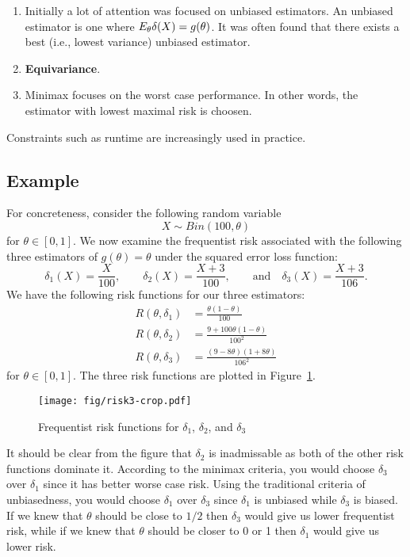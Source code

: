 \documentclass[twoside]{article}
\begin{document}
\begin{enumerate}
\item Initially a lot of attention was focused on unbiased estimators. An
  unbiased estimator is one where $E_{\theta}\delta(X) = g(\theta)$. It
  was often found that there exists a best (i.e., lowest variance) unbiased
  estimator.
\item \textbf{Equivariance}.
\item Minimax focuses on the worst case performance.  In other words, the estimator
   with lowest maximal risk is choosen.
\end{enumerate}

Constraints such as runtime are increasingly used in practice.

\subsection{Example}

For concreteness, consider \citep[Example 3.1, p.~40-41]{keener} the following
random variable
\begin{equation*}
X \sim Bin(100, \theta)
\end{equation*}
for $\theta \in [0,1]$.  We now examine the frequentist risk associated with
the following three estimators of $g(\theta) = \theta$ under the squared error
loss function:
\begin{equation*}
\delta_1(X) = \frac{X}{100}, \qquad \delta_2(X) = \frac{X+3}{100},
              \qquad \text{and} \quad \delta_3(X) = \frac{X+3}{106}.
\end{equation*}
We have the following risk functions for our three estimators:
\begin{align*}
R(\theta, \delta_1) &= \frac{\theta(1-\theta)}{100}\\
R(\theta, \delta_2) &= \frac{9+100 \theta(1-\theta)}{100^2}\\
R(\theta, \delta_3) &= \frac{(9-8\theta)(1+8\theta)}{106^2}
\end{align*}
for $\theta \in [0,1]$.  The three risk functions are plotted in
Figure~\ref{fig:figure3}. 

\begin{figure}[ht]
\centering
\texttt{[image: fig/risk3-crop.pdf]}
\caption{Frequentist risk functions for $\delta_1$, $\delta_2$, and $\delta_3$}
\label{fig:figure3}
\end{figure}

It should be clear from the figure that $\delta_2$ is inadmissable as both
of the other risk functions dominate it.  According to the minimax criteria,
you would choose $\delta_3$ over $\delta_1$ since it has better worse case
risk.  Using the traditional criteria of unbiasedness, you would choose
$\delta_1$ over $\delta_3$ since $\delta_1$ is unbiased while $\delta_3$ is
biased.  If we knew that $\theta$ should be close to $1/2$ then $\delta_3$
would give us lower frequentist risk, while if we knew that $\theta$ should
be closer to 0 or 1 then $\delta_1$ would give us lower risk.
\end{document}
